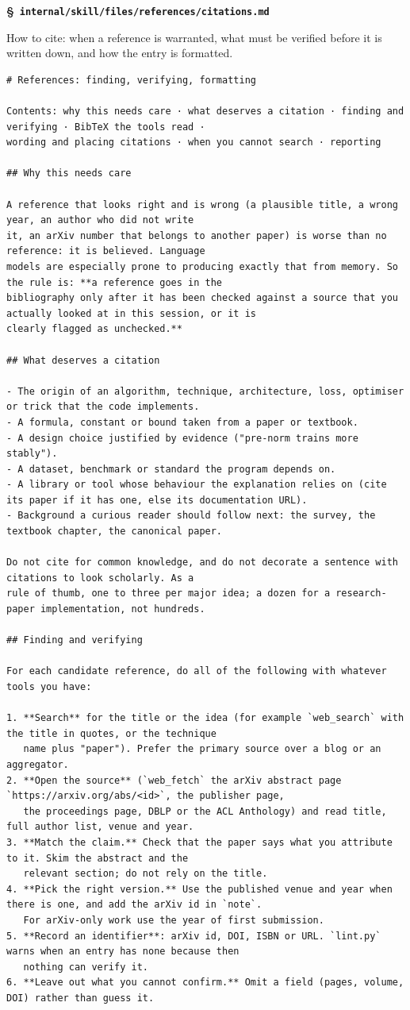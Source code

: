 \documentclass[10pt,a4paper]{article}
\newcounter{chunk}
\renewcommand{\thechunk}{\S\arabic{chunk}}
\newcommand{\chunkhead}[2]{\par\addvspace{1.2ex}\noindent\refstepcounter{chunk}\label{#1}{\bfseries\thechunk}\enspace #2\par\nopagebreak}
\newcommand{\filebadge}{{\footnotesize\itshape\color{tuftegray}file}}
\begin{document}
\chunkhead{chunk283}{\filebadge\ \textbf{\texttt{internal/\allowbreak{}skill/\allowbreak{}files/\allowbreak{}references/\allowbreak{}citations.\allowbreak{}md}}}
How to cite: when a reference is warranted, what must be verified before it is written down, and how the entry is formatted.
\begin{Verbatim}
# References: finding, verifying, formatting

Contents: why this needs care · what deserves a citation · finding and verifying · BibTeX the tools read ·
wording and placing citations · when you cannot search · reporting

## Why this needs care

A reference that looks right and is wrong (a plausible title, a wrong year, an author who did not write
it, an arXiv number that belongs to another paper) is worse than no reference: it is believed. Language
models are especially prone to producing exactly that from memory. So the rule is: **a reference goes in the
bibliography only after it has been checked against a source that you actually looked at in this session, or it is
clearly flagged as unchecked.**

## What deserves a citation

- The origin of an algorithm, technique, architecture, loss, optimiser or trick that the code implements.
- A formula, constant or bound taken from a paper or textbook.
- A design choice justified by evidence ("pre-norm trains more stably").
- A dataset, benchmark or standard the program depends on.
- A library or tool whose behaviour the explanation relies on (cite its paper if it has one, else its documentation URL).
- Background a curious reader should follow next: the survey, the textbook chapter, the canonical paper.

Do not cite for common knowledge, and do not decorate a sentence with citations to look scholarly. As a
rule of thumb, one to three per major idea; a dozen for a research-paper implementation, not hundreds.

## Finding and verifying

For each candidate reference, do all of the following with whatever tools you have:

1. **Search** for the title or the idea (for example `web_search` with the title in quotes, or the technique
   name plus "paper"). Prefer the primary source over a blog or an aggregator.
2. **Open the source** (`web_fetch` the arXiv abstract page `https://arxiv.org/abs/<id>`, the publisher page,
   the proceedings page, DBLP or the ACL Anthology) and read title, full author list, venue and year.
3. **Match the claim.** Check that the paper says what you attribute to it. Skim the abstract and the
   relevant section; do not rely on the title.
4. **Pick the right version.** Use the published venue and year when there is one, and add the arXiv id in `note`.
   For arXiv-only work use the year of first submission.
5. **Record an identifier**: arXiv id, DOI, ISBN or URL. `lint.py` warns when an entry has none because then
   nothing can verify it.
6. **Leave out what you cannot confirm.** Omit a field (pages, volume, DOI) rather than guess it.


\end{Verbatim}
\end{document}
